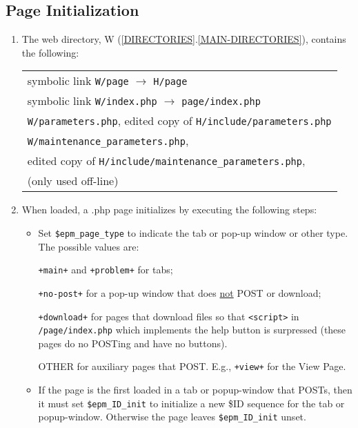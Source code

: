 \documentclass[12pt]{article}
\newcommand{\EOL}{\penalty \exhyphenpenalty}
\newcommand{\sref}[2]{(\ref{#1}.\ref{#2})}
\begin{document}
\subsection{Page Initialization}
\label{PAGE-INITIALIZATION}

\begin{enumerate}
\item The web directory, W \sref{DIRECTORIES}{MAIN-DIRECTORIES},
     contains the following:\label{W-CONTENTS}

  \hspace*{0.2in}\begin{tabular}{l}
      symbolic link {\tt W/page} $\longrightarrow$ {\tt H/page} \\
      symbolic link {\tt W/index.php}
          $\longrightarrow$ {\tt page/index.php} \\
      {\tt W/parameters.php}, edited copy of {\tt H/include/parameters.php} \\
      {\tt W/maintenance\_parameters.php}, \\
      \hspace*{0.2in}edited copy of
           {\tt H/include/maintenance\_parameters.php}, \\
      \hspace*{0.2in}(only used off-line) \\
      \end{tabular}

\item When loaded, a .php page initializes by executing the following steps:
\begin{itemize}
\item Set {\tt \$epm\_page\_type} to indicate the tab or pop-up window
      or other type.  The possible values are:
      
      {\tt +main+} and {\tt +problem+} for tabs;
      
      {\tt +no-post+} for a pop-up window that does \underline{not}
      POST or download;
      
      {\tt +download+} for pages that download files
      so that {\tt <script>}
      in {\tt /page/\EOL index.php} which implements the help button
      is surpressed (these pages do no POSTing and have
      no buttons).
      
      OTHER for auxiliary pages that POST.  E.g., {\tt +view+}
      for the View Page.

\item If the page is the first loaded in a tab or popup-window that POSTs,
      then it must set {\tt \$epm\_ID\_init} to initialize a new
      \$ID sequence for the tab or popup-window.  Otherwise the page
      leaves {\tt \$epm\_ID\_init} unset.


\end{itemize}
\end{enumerate}
\end{document}
